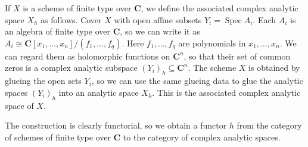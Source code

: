 If $X$ is a scheme of finite type over $\mathbf{C}$, we define the associated complex analytic space $X_h$ as follows. Cover $X$ with open affine subsets $Y_i = \operatorname{Spec} A_i$. Each $A_i$ is an algebra of finite type over $\mathbf{C}$, so we can write it as $A_i \cong \mathbf{C}[x_1, \ldots, x_n]/(f_1, \ldots, f_q)$. Here $f_1, \ldots, f_q$ are polynomials in $x_1, \ldots, x_n$. We can regard them as holomorphic functions on $\mathbf{C}^n$, so that their set of common zeros is a complex analytic subspace $(Y_i)_h \subseteq \mathbf{C}^n$. The scheme $X$ is obtained by glueing the open sets $Y_i$, so we can use the same glueing data to glue the analytic spaces $(Y_i)_h$ into an analytic space $X_h$. This is the associated complex analytic space of $X$.

The construction is clearly functorial, so we obtain a functor $h$ from the category of schemes of finite type over $\mathbf{C}$ to the category of complex analytic spaces.
